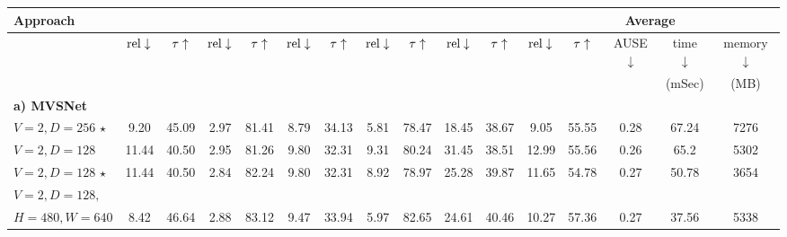 \begin{table}[ht!]

\def\arraystretch{1.5}
\setlength{\tabcolsep}{1mm}
\begin{adjustbox}{width=1\textwidth}
\begin{tabular}{|l
|c c
|c c
|c c
|c c
|c c
||c |c |c |c |c
|}

\hline
    \textbf{Approach}
    & \multicolumn{2}{c|}{\textbf{\kittishort{}}}
    & \multicolumn{2}{c|}{\textbf{\dtushort{}{}}}
    & \multicolumn{2}{c|}{\textbf{\scannetshort{}}}
    & \multicolumn{2}{c|}{\textbf{\tanksandtemplesshort{}}}
    & \multicolumn{2}{c|}{\textbf{\ethdshort{}}}
    & \multicolumn{5}{c|}{\textbf{Average}}
    \\
\hline

    & $\textrm{rel}\downarrow$ & $\tau\uparrow$
    & $\textrm{rel}\downarrow$ & $\tau\uparrow$
    & $\textrm{rel}\downarrow$ & $\tau\uparrow$
    & $\textrm{rel}\downarrow$ & $\tau\uparrow$
    & $\textrm{rel}\downarrow$ & $\tau\uparrow$
    & $\textrm{rel}\downarrow$ & $\tau\uparrow$ & AUSE$ \downarrow$ & time $\downarrow$ & memory $\downarrow$
    \\

    &&&&&&&&&&&&&&(mSec)&(MB)\\
    \hline
    \hline
\rowcolor{bgcolor}
    \textbf{a) MVSNet} \cite{schroeppel2022benchmark}
	& 
	& 
	& 
	& 
	& 
	& 
	& 
	& 
	& 
	& 
	& 
	& 
 	& 
	& 
	& 
    \\
\hline
	$V=2, D=256$ \(\star\)
	& 9.20
	& 45.09
	& 2.97
	& 81.41
	& {8.79}
	& {34.13}
	& 5.81
	& 78.47
	& 18.45
	& 38.67
	& 9.05
	& 55.55
        & 0.28
        & 67.24
        & 7276
	\\ 
\hline
	$V=2, D=128$
	& 11.44
	& 40.50
	& 2.95
	& 81.26
	& 9.80
	& 32.31
	& 9.31
	& 80.24
	& 31.45
	& 38.51
	& 12.99
	& 55.56
        & 0.26
        & 65.2
        & 5302
	\\ 
 \hline

	$V=2, D=128$ \(\star\)
	& 11.44
	& 40.50
	& 2.84
	& 82.24
	& 9.80
	& 32.31
	& 8.92
	& 78.97
	& 25.28
	& 39.87
	& 11.65
	& 54.78
        & 0.27
        & 50.78
        & 3654
	\\
 \hline
         $V=2, D=128,$
	& 
	& 
	& 
	& 
	& 
	& 
	& 
	& 
	& 
	& 
	& 
	& 
 	& 
	& 
	& 
	\\ 
        $H=480, W=640$ 
	& 8.42
	& 46.64
	& 2.88
	& 83.12
	& 9.47
	& 33.94
	& 5.97
	& 82.65
	& 24.61
	& 40.46
	& 10.27
	& 57.36
        & 0.27
        & 37.56
        & 5338
	\\ 
	

\end{tabular}
\end{adjustbox}
\end{table}
